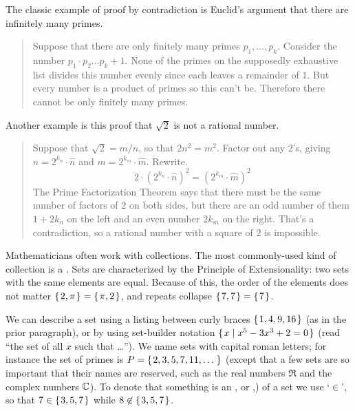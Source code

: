 The classic example of proof by contradiction is Euclid's
argument that there are infinitely many primes.
\begin{quote}\small
Suppose that there are only finitely many primes \( p_1,\dots,p_k \).
Consider the number \( p_1\cdot p_2\dots p_k +1 \).
None of the primes on the supposedly exhaustive list divides this number
evenly since each leaves a remainder of \( 1 \).
But every number is a product of primes so this can't be.
Therefore there cannot be only finitely many primes.
\end{quote}

Another example is this proof that
\( \sqrt{2} \) is not a rational number.
\begin{quote}\small
Suppose that  \( \sqrt{2}=m/n \), so that $2n^2=m^2$.
Factor out any \( 2 \)'s, giving
\( n=2^{k_n}\cdot \hat{n} \)
and
\( m=2^{k_m}\cdot \hat{m} \).
Rewrite.
\begin{equation*}
  2\cdot (2^{k_n}\cdot \hat{n})^2
  =
  (2^{k_m}\cdot \hat{m})^2
\end{equation*}
The Prime Factorization Theorem says that there must be the same number of
factors of \( 2 \) on both sides, but there are an odd number of them
\( 1+2k_n \) on the left and an even number \( 2k_m \) on the right.
That's a contradiction, so a rational number with a square of
\( 2 \) is impossible.
\end{quote}
















Mathematicians often work with collections. 
The most commonly-used kind of collection is a . 
Sets are characterized by the Principle of Extensionality: 
two sets with the same elements are equal. 
Because of this, the order of the elements does not matter 
\( \mbox{$\{\hspace{0.1em}2,\pi\hspace{0.1em}\}$}=\mbox{$\{\hspace{0.1em}\pi,2\hspace{0.1em}\}$} \), 
and
repeats collapse \( \mbox{$\{\hspace{0.1em}7,7\hspace{0.1em}\}$}=\mbox{$\{\hspace{0.1em}7\hspace{0.1em}\}$} \).

We can describe a set using a listing between curly braces
\( \mbox{$\{\hspace{0.1em} 1,4,9,16 \hspace{0.1em}\}$} \) (as in the prior paragraph), 
or by using set-builder notation
\( \mbox{$\{\hspace{0.1em}x\mid x^5-3x^3+2=0 \hspace{0.1em}\}$} \) (read ``the set of all \( x \)
such that \ldots'').
We name sets with capital roman letters; for instance the set of primes is
\( P=\mbox{$\{\hspace{0.1em}2,3,5,7,11,\ldots\,\hspace{0.1em}\}$} \) (except that a few sets 
are so important that their names are reserved, such as the
real numbers \( \Re \)
and the complex numbers \( \mathbb{C} \)).
To denote that something is an 
, 
or ,) of a set we
use `\(\in \)',
so that \( 7\in\mbox{$\{\hspace{0.1em}3,5,7\hspace{0.1em}\}$} \) while \( 8\not\in\mbox{$\{\hspace{0.1em}3,5,7\hspace{0.1em}\}$} \).

